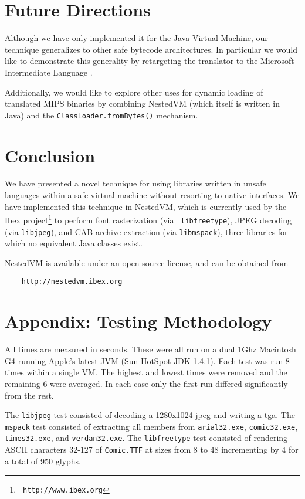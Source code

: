 \documentclass{acmconf}
\begin{document}
\section{Future Directions}

Although we have only implemented it for the Java Virtual Machine, our
technique generalizes to other safe bytecode architectures.  In
particular we would like to demonstrate this generality by retargeting
the translator to the Microsoft Intermediate Language \cite{msil}.

Additionally, we would like to explore other uses for dynamic loading
of translated MIPS binaries by combining NestedVM (which itself is
written in Java) and the {\tt ClassLoader.fromBytes()} mechanism.


\section{Conclusion}

We have presented a novel technique for using libraries written in
unsafe languages within a safe virtual machine without resorting to
native interfaces.  We have implemented this technique in NestedVM,
which is currently used by the Ibex project\footnote{{\tt
http://www.ibex.org}} to perform font rasterization (via {\tt
libfreetype}), JPEG decoding (via {\tt libjpeg}), and CAB archive
extraction (via {\tt libmspack}), three libraries for which no
equivalent Java classes exist.

NestedVM is available under an open source license, and can be
obtained from
\begin{verbatim}
    http://nestedvm.ibex.org
\end{verbatim}


\section{Appendix: Testing Methodology}

All times are measured in seconds. These were all run on a dual 1Ghz
Macintosh G4 running Apple's latest JVM (Sun HotSpot JDK 1.4.1). Each
test was run 8 times within a single VM. The highest and lowest times
were removed and the remaining 6 were averaged.  In each case only the
first run differed significantly from the rest.

The {\tt libjpeg} test consisted of decoding a 1280x1024 jpeg and
writing a tga.  The {\tt mspack} test consisted of extracting all
members from {\tt arial32.exe}, {\tt comic32.exe}, {\tt times32.exe},
and {\tt verdan32.exe}. The {\tt libfreetype} test consisted of
rendering ASCII characters 32-127 of {\tt Comic.TTF} at sizes from 8
to 48 incrementing by 4 for a total of 950 glyphs.


\end{document}
